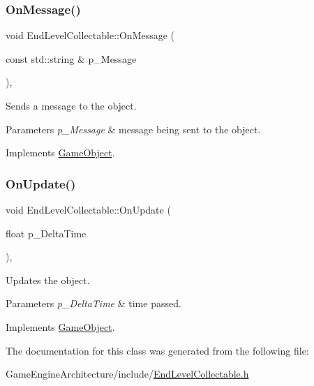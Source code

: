 \subsubsection{\texorpdfstring{OnMessage()}{OnMessage()}}
{\footnotesize\ttfamily void End\+Level\+Collectable\+::\+On\+Message (\begin{DoxyParamCaption}\item[{const std\+::string \&}]{p\+\_\+\+Message }\end{DoxyParamCaption})\hspace{0.3cm}{\ttfamily [override]}, {\ttfamily [virtual]}}



Sends a message to the object. 


\begin{DoxyParams}{Parameters}
{\em p\+\_\+\+Message} & message being sent to the object. \\
\hline
\end{DoxyParams}


Implements \mbox{\hyperlink{class_game_object_a162f15f809f5181e3264b9f4d768bea2}{Game\+Object}}.

\mbox{\label{class_end_level_collectable_a6d04aaa0751a21b0d4922339d6524887}} 
\subsubsection{\texorpdfstring{OnUpdate()}{OnUpdate()}}
{\footnotesize\ttfamily void End\+Level\+Collectable\+::\+On\+Update (\begin{DoxyParamCaption}\item[{float}]{p\+\_\+\+Delta\+Time }\end{DoxyParamCaption})\hspace{0.3cm}{\ttfamily [override]}, {\ttfamily [virtual]}}



Updates the object. 


\begin{DoxyParams}{Parameters}
{\em p\+\_\+\+Delta\+Time} & time passed. \\
\hline
\end{DoxyParams}


Implements \mbox{\hyperlink{class_game_object_a3d4444ab3efd5e3041014da90a66c081}{Game\+Object}}.



The documentation for this class was generated from the following file\+:\begin{DoxyCompactItemize}
\item 
Game\+Engine\+Architecture/include/\mbox{\hyperlink{_end_level_collectable_8h}{End\+Level\+Collectable.\+h}}\end{DoxyCompactItemize}

